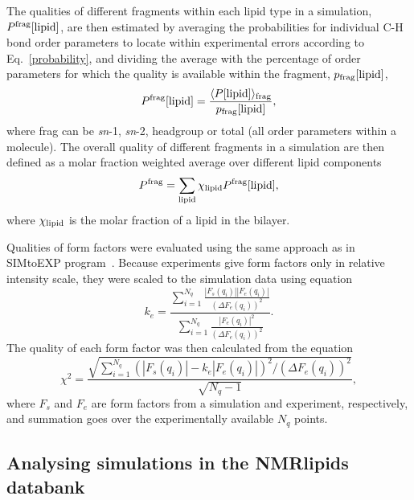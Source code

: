 \documentclass[fleqn,10pt]{wlscirep}
\begin{document}
The qualities of different fragments within each lipid type in a simulation, $P^{\rm frag}[{\rm lipid}]$, are then estimated by averaging the probabilities for individual C-H bond order parameters to locate within experimental errors according to Eq.~\ref{probability}, and dividing the average with the percentage of order parameters for which the quality is available within the fragment, $p_{\rm frag}[{\rm lipid}]$,
\begin{equation}
    P^{\rm frag}[{\rm lipid}] = \frac{\langle P[{\rm lipid}]\rangle_{\rm frag}}{p_{\rm frag}[{\rm lipid}]},
\end{equation}
 where frag can be {\it sn}-1, {\it sn}-2, headgroup or total (all order parameters within a molecule). The overall quality of different fragments in a simulation are then defined as a molar fraction weighted average over different lipid components
\begin{equation}
    P^{\rm frag} = \sum_{\rm lipid} \chi_{\rm lipid} P^{\rm frag}[{\rm lipid}],
\end{equation}
where $\chi_{\rm lipid}$ is the molar fraction of a lipid in the bilayer.

Qualities of form factors were evaluated using the same approach as in SIMtoEXP program~\cite{kucerka10}. Because experiments give form factors only in relative intensity scale, they were scaled to the simulation data using equation
\begin{equation}
    k_e = \frac{\sum_{i=1}^{N_q} \frac{|F_s(q_i)||F_e(q_i)|}{(\Delta F_e(q_i))^2}}{\sum_{i=1}^{N_q} \frac{|F_e(q_i)|^2}{(\Delta F_e(q_i))^2}}.
\end{equation}
The quality of each form factor was then calculated from the equation
\begin{equation}
    \chi^2 = \frac{\sqrt{\sum_{i=1}^{N_q}(|F_s(q_i)|-k_e|F_e(q_i)|)^2/(\Delta F_e(q_i))^2}}{\sqrt{N_q-1}},
\end{equation}
where $F_s$ and $F_e$ are form factors from a simulation and experiment, respectively, and summation goes over the experimentally available $N_q$ points. 



\subsection{Analysing simulations in the NMRlipids databank}
\end{document}
